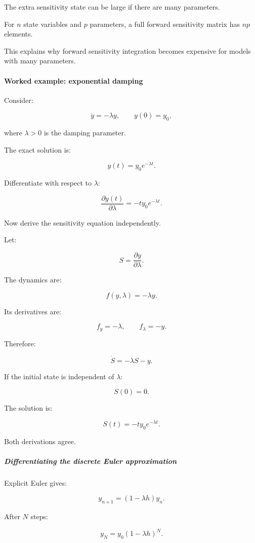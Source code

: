 The extra sensitivity state can be large if there are many parameters.

For \(n\) state variables and \(p\) parameters, a full forward sensitivity matrix has \(np\) elements.

This explains why forward sensitivity integration becomes expensive for models with many parameters.

\paragraph{Worked example: exponential damping}\label{worked-example-exponential-damping}

Consider:

\[
\dot y=-\lambda y, \qquad y(0)=y_0,
\]

where \(\lambda>0\) is the damping parameter.

The exact solution is:

\[
y(t)=y_0e^{-\lambda t}.
\]

Differentiate with respect to \(\lambda\):

\[
\boxed{ \frac{\partial y(t)}{\partial\lambda} = -ty_0e^{-\lambda t} }.
\]

Now derive the sensitivity equation independently.

Let:

\[
S=\frac{\partial y}{\partial\lambda}.
\]

The dynamics are:

\[
f(y,\lambda)=-\lambda y.
\]

Its derivatives are:

\[
f_y=-\lambda, \qquad f_\lambda=-y.
\]

Therefore:

\[
\boxed{ \dot S=-\lambda S-y }.
\]

If the initial state is independent of \(\lambda\):

\[
S(0)=0.
\]

The solution is:

\[
S(t)=-ty_0e^{-\lambda t}.
\]

Both derivations agree.

\subparagraph{Differentiating the discrete Euler approximation}\label{differentiating-the-discrete-euler-approximation}

Explicit Euler gives:

\[
y_{n+1}=(1-\lambda h)y_n.
\]

After \(N\) steps:

\[
y_N=y_0(1-\lambda h)^N.
\]

